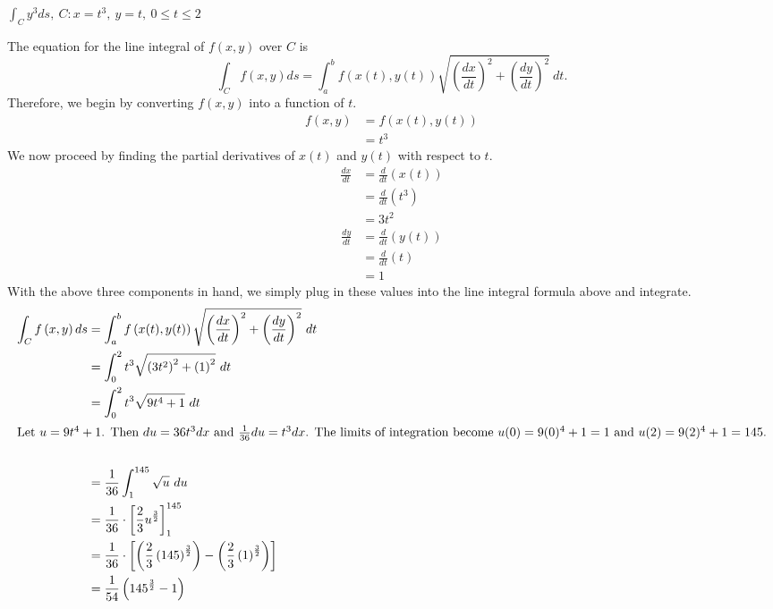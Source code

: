 \begin{exercise}
	$\displaystyle\int_C y^3 ds, \ C:x=t^3, \ y=t, \ 0\leq t \leq 2$
\end{exercise}
\begin{solution}
	The equation for the line integral of $f\left(x,y\right)$ over $C$ is
	\begin{equation*}
	\int_C f\left(x,y\right) ds = \int_a^b f\left(x(t),y(t)\right) \sqrt{\left(\frac{dx}{dt}\right)^2 + \left(\frac{dy}{dt}\right)^2}\ dt.
	\end{equation*}
	Therefore, we begin by converting $f\left(x,y\right)$ into a function of $t$.
	\begin{align*}
	f\left(x,y\right) &= f\left(x(t),y(t)\right) \\
	&= t^3
	\end{align*}
	We now proceed by finding the partial derivatives of $x(t)$ and $y(t)$ with respect to $t$.
	\begin{align*}
	\frac{dx}{dt} &= \frac{d}{dt}\left(x(t)\right) \\
	&= \frac{d}{dt}\left(t^3\right) \\
	&= 3t^2
	\end{align*}
	\begin{align*}
	\frac{dy}{dt} &= \frac{d}{dt}\left(y(t)\right) \\
	&= \frac{d}{dt}\left(t\right) \\
	&= 1
	\end{align*}
	With the above three components in hand, we simply plug in these values into the line integral formula above and integrate.
	\begin{align*}
	\int_C f\left(x,y\right) ds &= \int_a^b f\left(x(t),y(t)\right)\sqrt{\left(\frac{dx}{dt}\right)^2+\left(\frac{dy}{dt}\right)^2}\ dt \\
	&= \int_0^2 t^3 \sqrt{\left(3t^2\right)^2 + \left(1\right)^2} \ dt \\
	&= \int_0^2 t^3 \sqrt{ 9t^4 + 1 }\ dt \\
	\intertext{Let $u = 9t^4 + 1$. Then $du = 36t^3dx$ and $\frac{1}{36}du = t^3dx$. The limits of integration become $u(0) = 9(0)^4+1 = 1$ and $u(2)=9(2)^4+1=145$.} \\
	&= \frac{1}{36} \int_{1}^{145} \sqrt{u} \ du \\
	&= \frac{1}{36} \cdot \left[ \frac{2}{3}u^{\frac{3}{2}} \right]_1^{145} \\
	&= \frac{1}{36} \cdot \left[ \left( \frac{2}{3}\left(145\right)^{\frac{3}{2}} \right) - \left( \frac{2}{3} \left(1\right)^{\frac{3}{2}} \right) \right] \\
	&= \frac{1}{54} \left( 145^{\frac{3}{2}} - 1 \right)
	\end{align*}
\end{solution}
